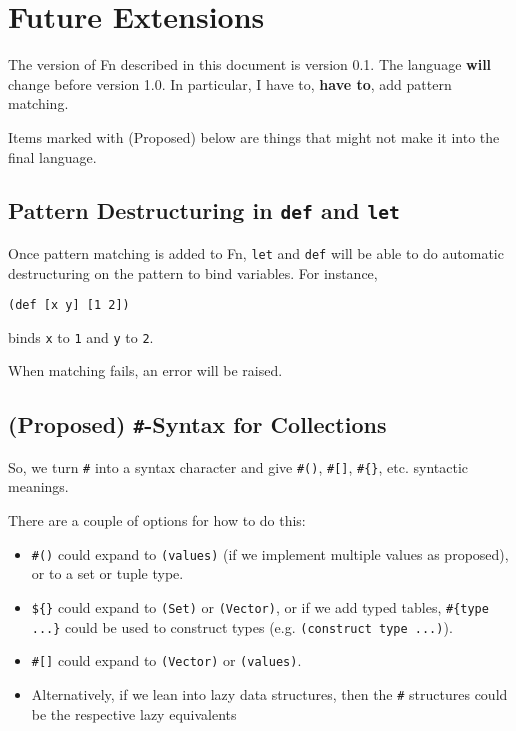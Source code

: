 \documentclass[11pt]{article}
\begin{document}
\section{Future Extensions}
\label{sec:org72dcd46}

The version of Fn described in this document is version 0.1. The language \textbf{will}
change before version 1.0. In particular, I have to, \textbf{have to}, add pattern
matching.

Items marked with (Proposed) below are things that might not make it into the
final language.

\subsection{Pattern Destructuring in \texttt{def} and \texttt{let}}
\label{sec:orgb8d083e}

Once pattern matching is added to Fn, \texttt{let} and \texttt{def} will be able to do
automatic destructuring on the pattern to bind variables. For instance,
\begin{verbatim}
(def [x y] [1 2])
\end{verbatim}
binds \texttt{x} to \texttt{1} and \texttt{y} to \texttt{2}.

When matching fails, an error will be raised.


\subsection{(Proposed) \texttt{\#}-Syntax for Collections}
\label{sec:org6d1883e}

So, we turn \texttt{\#} into a syntax character and give \texttt{\#()}, \texttt{\#[]}, \texttt{\#\{\}}, etc. syntactic
meanings.

There are a couple of options for how to do this:
\begin{itemize}
\item \texttt{\#()} could expand to \texttt{(values)} (if we implement multiple values as proposed), or
to a set or tuple type.
\item \texttt{\$\{\}} could expand to \texttt{(Set)} or \texttt{(Vector)}, or if we add typed tables, \texttt{\#\{type ...\}}
could be used to construct types (e.g. \texttt{(construct type ...)}).
\item \texttt{\#[]} could expand to \texttt{(Vector)} or \texttt{(values)}.
\item Alternatively, if we lean into lazy data structures, then the \texttt{\#} structures
could be the respective lazy equivalents
\end{itemize}
\end{document}

